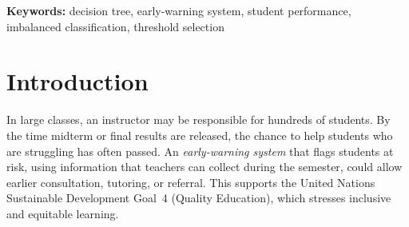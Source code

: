 \documentclass[12pt,a4paper]{article}
\theoremstyle{definition}
\begin{document}
\setcounter{page}{1}

\begin{abstract}
\noindent Teachers handling large classes rarely notice struggling students before final grades are released. This paper builds an interpretable early-warning model that predicts whether a student will finish At-risk/Fail (letter grade D or F) from three behavioral variables: weekly self-study hours, class attendance, and class participation. Following the model-development workflow of the course, a CART Decision Tree Classifier is trained on the Kaggle Student Performance Dataset (1{,}000{,}000 students, 5.1\% At-risk/Fail) using a stratified training/validation/test split. Hyperparameters are chosen by five-fold cross-validated grid search, decision thresholds are chosen on the validation set only, and the test set is used once. On 150{,}000 unseen students, the final tree (depth 5, 32 leaves) reaches ROC-AUC 0.956. At the $F_1$-optimal threshold it attains precision 0.517 and recall 0.610; at a cost-sensitive threshold (missed student costs 10 units, false alarm 2) recall rises to 0.778 and the mistake cost falls by 54\% compared with flagging no one. The tree performs on par with a logistic-regression baseline while remaining readable as if--then rules. Weekly self-study hours is the only informative predictor; attendance and participation show essentially no association with the outcome, which together with other features of the data suggests that the dataset is simulated.
\end{abstract}

\noindent\textbf{Keywords:} decision tree, early-warning system, student performance, imbalanced classification, threshold selection

\newpage
\tableofcontents
\newpage

\setcounter{page}{1}

\section{Introduction}

In large classes, an instructor may be responsible for hundreds of students. By the time midterm or final results are released, the chance to help students who are struggling has often passed. An \emph{early-warning system} that flags students at risk, using information that teachers can collect during the semester, could allow earlier consultation, tutoring, or referral. This supports the United Nations Sustainable Development Goal~4 (Quality Education), which stresses inclusive and equitable learning.
\end{document}
